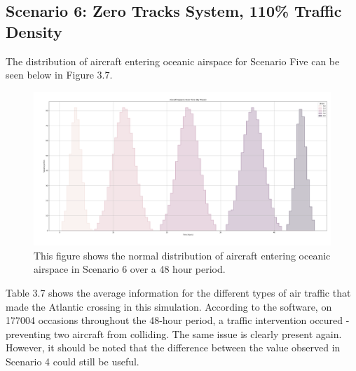 \documentclass[stu, a4paper, 12pt, floatsintext]{apa7}
\numberwithin{figure}{section}
\numberwithin{table}{section}
\numberwithin{equation}{section}
\begin{document}
\subsection{Scenario 6: Zero Tracks System, 110\% Traffic Density}
The distribution of aircraft entering oceanic airspace for Scenario Five can be seen below in Figure 3.7.

\begin{figure}[H]
    \caption{This figure shows the normal distribution of aircraft entering oceanic airspace in Scenario 6 over a 48 hour period.}
    \label{fig:3.7}
    \centering
    \includegraphics[width=1.1\textwidth]{pictures/Figure 3.7.png}    
\end{figure}

Table 3.7 shows the average information for the different types of air traffic that made the Atlantic crossing in this simulation. According to the software, on 177004 occasions throughout the 48-hour period, a traffic intervention occured - preventing two aircraft from colliding. The same issue is clearly present again. However, it should be noted that the difference between the value observed in Scenario 4 could still be useful.
\end{document}
